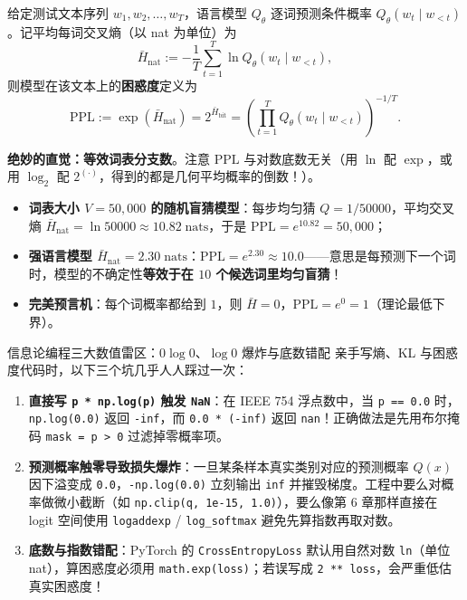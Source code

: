 \begin{defBox}
\begin{definition}
\label{def:ch4-ppl}
给定测试文本序列 $w_1, w_2, \dots, w_T$，语言模型 $Q_\theta$ 逐词预测条件概率 $Q_\theta(w_t \mid w_{<t})$。记平均每词交叉熵（以 nat 为单位）为
\[
  \bar{H}_{\mathrm{nat}} := -\frac{1}{T}\sum_{t=1}^T \ln Q_\theta(w_t \mid w_{<t}),
\]
则模型在该文本上的\textbf{困惑度}定义为
\begin{equation}
  \mathrm{PPL} := \exp(\bar{H}_{\mathrm{nat}}) = 2^{\bar{H}_{\mathrm{bit}}} = \left(\prod_{t=1}^T Q_\theta(w_t \mid w_{<t})\right)^{-1/T}. \label{eq:ch4-ppl}
\end{equation}
\end{definition}
\end{defBox}

\textbf{绝妙的直觉：等效词表分支数}。注意 $\mathrm{PPL}$ 与对数底数无关（用 $\ln$ 配 $\exp$，或用 $\log_2$ 配 $2^{(\cdot)}$，得到的都是几何平均概率的倒数！）。
\begin{itemize}
  \item \textbf{词表大小 $V = 50{,}000$ 的随机盲猜模型}：每步均匀猜 $Q = 1/50000$，平均交叉熵 $\bar{H}_{\mathrm{nat}} = \ln 50000 \approx 10.82\;\text{nats}$，于是 $\mathrm{PPL} = e^{10.82} = 50{,}000$；
  \item \textbf{强语言模型 $\bar{H}_{\mathrm{nat}} = 2.30\;\text{nats}$}：$\mathrm{PPL} = e^{2.30} \approx 10.0$——意思是每预测下一个词时，模型的不确定性\textbf{等效于在 $10$ 个候选词里均匀盲猜}！
  \item \textbf{完美预言机}：每个词概率都给到 $1$，则 $\bar{H} = 0$，$\mathrm{PPL} = e^0 = 1$（理论最低下界）。
\end{itemize}

\begin{failBox}{信息论编程三大数值雷区：$0\log 0$、$\log 0$ 爆炸与底数错配}
亲手写熵、KL 与困惑度代码时，以下三个坑几乎人人踩过一次：
\begin{enumerate}
  \item \textbf{直接写 \texttt{p * np.log(p)} 触发 \texttt{NaN}}：在 IEEE 754 浮点数中，当 \texttt{p == 0.0} 时，\texttt{np.log(0.0)} 返回 \texttt{-inf}，而 \texttt{0.0 * (-inf)} 返回 \texttt{nan}！正确做法是先用布尔掩码 \texttt{mask = p > 0} 过滤掉零概率项。
  \item \textbf{预测概率触零导致损失爆炸}：一旦某条样本真实类别对应的预测概率 $Q(x)$ 因下溢变成 \texttt{0.0}，\texttt{-np.log(0.0)} 立刻输出 \texttt{inf} 并摧毁梯度。工程中要么对概率做微小截断（如 \texttt{np.clip(q, 1e-15, 1.0)}），要么像第 6 章那样直接在 logit 空间使用 \texttt{logaddexp} / \texttt{log\_softmax} 避免先算指数再取对数。
  \item \textbf{底数与指数错配}：PyTorch 的 \texttt{CrossEntropyLoss} 默认用自然对数 \texttt{ln}（单位 nat），算困惑度必须用 \texttt{math.exp(loss)}；若误写成 \texttt{2 ** loss}，会严重低估真实困惑度！
\end{enumerate}
\end{failBox}

